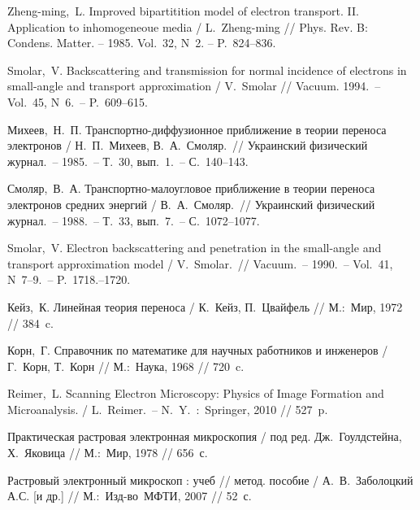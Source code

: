\def\bibname{СПИСОК ИСПОЛЬЗОВАННЫХ ИСТОЧНИКОВ}
\begin{thebibliography}{99}
\newcommand{\tabfix}{\hspace*{1.5cm}}
 \tabfix Zheng-ming,~L. Improved bipartitition model of electron
transport. II. Application to inhomogeneoue media / L.~Zheng-ming // Phys. Rev. B:
Condens. Matter. -- 1985. Vol.~32, N~2. -- P.~824--836.

 \tabfix Smolar,~V. Backscattering and transmission for normal
incidence of electrons in small-angle and transport approximation /
V.~Smolar // Vacuum. 1994.~-- Vol.~45, N~6.~-- P.~609--615.

 \tabfix Михеев,~Н.~П. Транспортно-диффузионное приближение в теории
переноса электронов / Н.~П.~Михеев, В.~А.~Смоляр.~// Украинский физический
журнал.~-- 1985.~-- Т.~30, вып.~1.~-- С.~140--143.

 \tabfix Смоляр,~В.~А. Транспортно-малоугловое приближение в теории
переноса электронов средних энергий / В.~А.~Смоляр.~// Украинский физический
журнал.~-- 1988.~-- Т.~33, вып.~7.~-- С.~1072--1077.

 \tabfix Smolar,~V. Electron backscattering and penetration in the
small-angle and transport approximation model / V.~Smolar.~// Vacuum.~-- 1990.~--
Vol.~41, N~7--9.~-- P.~1718.--1720.

 \tabfix Кейз,~К. Линейная теория переноса / К.~Кейз, П.~Цвайфель //
М.:~Мир, 1972 // 384~c.

 \tabfix Корн,~Г. Справочник по математике для научных работников и
инженеров /  Г.~Корн, Т.~Корн // М.:~Наука, 1968 // 720~c.



 \tabfix Reimer,~L. Scanning Electron Microscopy: Physics of Image Formation
and Microanalysis. / L.~Reimer.~-- N.~Y.~:~Springer, 2010 // 527~p.

 \tabfix Практическая растровая электронная микроскопия / под ред.
Дж.~Гоулдстейна, Х.~Яковица // М.:~Мир, 1978 // 656~с.

 \tabfix Растровый электронный микроскоп : учеб // метод. пособие /
А.~В.~Заболоцкий А.С. [и др.] // М.:~Изд-во~МФТИ, 2007 //
52~с. %


\end{thebibliography}

